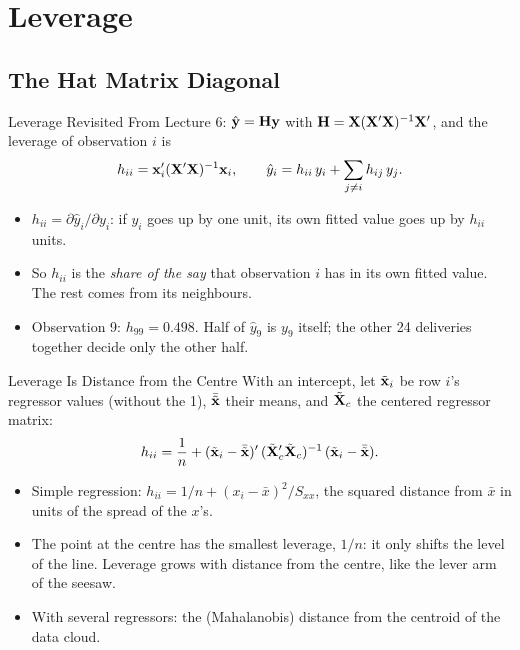 \section{Leverage}


\subsection{The Hat Matrix Diagonal}


\begin{frame}{Leverage Revisited}
    From Lecture 6: $\hat{\mathbf{y}}=\mathbf{H}\mathbf{y}$ with $\mathbf{H}=\mathbf{X}(\mathbf{X}'\mathbf{X})^{-1}\mathbf{X}'$, and the leverage of observation $i$ is
    \[
    h_{ii}=\mathbf{x}_i'(\mathbf{X}'\mathbf{X})^{-1}\mathbf{x}_i,
    \qquad
    \hat y_i = h_{ii}\,y_i+\sum_{j\ne i}h_{ij}\,y_j .
    \]
    \begin{itemize}
        \item $h_{ii}=\partial\hat y_i/\partial y_i$: if $y_i$ goes up by one unit, its own fitted value goes up by $h_{ii}$ units.
        \item So $h_{ii}$ is the \emph{share of the say} that observation $i$ has in its own fitted value. The rest comes from its neighbours.
        \item Observation 9: $h_{99}=0.498$. Half of $\hat y_9$ is $y_9$ itself; the other 24 deliveries together decide only the other half.
    \end{itemize}
\end{frame}


\begin{frame}{Leverage Is Distance from the Centre}
    \small
    With an intercept, let $\tilde{\mathbf{x}}_i$ be row $i$'s regressor values (without the 1), $\bar{\tilde{\mathbf{x}}}$ their means, and $\tilde{\mathbf{X}}_c$ the centered regressor matrix:
    \[
    h_{ii}=\frac1n+(\tilde{\mathbf{x}}_i-\bar{\tilde{\mathbf{x}}})'\,(\tilde{\mathbf{X}}_c'\tilde{\mathbf{X}}_c)^{-1}\,(\tilde{\mathbf{x}}_i-\bar{\tilde{\mathbf{x}}}).
    \]
    \begin{itemize}
        \item Simple regression: $h_{ii}=1/n+(x_i-\bar x)^2/S_{xx}$, the squared distance from $\bar x$ in units of the spread of the $x$'s.
        \item The point at the centre has the smallest leverage, $1/n$: it only shifts the level of the line. Leverage grows with distance from the centre, like the lever arm of the seesaw.
        \item With several regressors: the (Mahalanobis) distance from the centroid of the data cloud.
    \end{itemize}
\end{frame}


